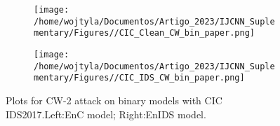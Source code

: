 \documentclass[conference]{IEEEtran}
\begin{document}
	
	\begin{figure}[H]
		\centering
		\begin{subfigure}[b]{0.45\textwidth}
			\texttt{[image: /home/wojtyla/Documentos/Artigo\_2023/IJCNN\_Suplementary/Figures//CIC\_Clean\_CW\_bin\_paper.png]}
			\label{fig:1}
		\end{subfigure}
		\hfill
		\begin{subfigure}[b]{0.45\textwidth}
			\texttt{[image: /home/wojtyla/Documentos/Artigo\_2023/IJCNN\_Suplementary/Figures//CIC\_IDS\_CW\_bin\_paper.png]}
			\label{fig:4}
		\end{subfigure}
		\caption{Plots for CW-2 attack on binary models with CIC IDS2017.Left:EnC model; Right:EnIDS model.}
		\label{fig:cic_cw_bin}
	\end{figure}
	
\end{document}
